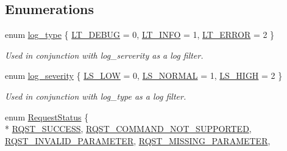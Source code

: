 \subsection*{Enumerations}
\begin{DoxyCompactItemize}
\item 
enum \hyperlink{namespacekisscpp_a18db16d1f4c281bec16e637c56b0cc88}{log\-\_\-type} \{ \hyperlink{namespacekisscpp_a18db16d1f4c281bec16e637c56b0cc88a5534dcd03ff720ecbe64b0c91ea3b228}{L\-T\-\_\-\-D\-E\-B\-U\-G} = 0, 
\hyperlink{namespacekisscpp_a18db16d1f4c281bec16e637c56b0cc88ad1c780d761d1eec16905dd8e306764aa}{L\-T\-\_\-\-I\-N\-F\-O} = 1, 
\hyperlink{namespacekisscpp_a18db16d1f4c281bec16e637c56b0cc88ad444adf89c01661a3f2cacd8baea3d90}{L\-T\-\_\-\-E\-R\-R\-O\-R} = 2
 \}
\begin{DoxyCompactList}\small\item\em Used in conjunction with log\-\_\-serverity as a log filter. \end{DoxyCompactList}\item 
enum \hyperlink{namespacekisscpp_a2479a56cdedf21357ca5c68adc699d00}{log\-\_\-severity} \{ \hyperlink{namespacekisscpp_a2479a56cdedf21357ca5c68adc699d00af0d1f4c43feb2c79cbd2c44cba171b9f}{L\-S\-\_\-\-L\-O\-W} = 0, 
\hyperlink{namespacekisscpp_a2479a56cdedf21357ca5c68adc699d00aac284c5fe534f527e04da9327a0e484e}{L\-S\-\_\-\-N\-O\-R\-M\-A\-L} = 1, 
\hyperlink{namespacekisscpp_a2479a56cdedf21357ca5c68adc699d00a98a2f9d2011b440e4a890b9c0dbb7bc2}{L\-S\-\_\-\-H\-I\-G\-H} = 2
 \}
\begin{DoxyCompactList}\small\item\em Used in conjunction with log\-\_\-type as a log filter. \end{DoxyCompactList}\item 
enum \hyperlink{namespacekisscpp_af5792fb0f68695c1a1e7a4c720d9262e}{Request\-Status} \{ \\*
\hyperlink{namespacekisscpp_af5792fb0f68695c1a1e7a4c720d9262ea48f403b25d056ead863e1bb74664b388}{R\-Q\-S\-T\-\_\-\-S\-U\-C\-C\-E\-S\-S}, 
\hyperlink{namespacekisscpp_af5792fb0f68695c1a1e7a4c720d9262ead080a858803c520f16f1d575431e19ec}{R\-Q\-S\-T\-\_\-\-C\-O\-M\-M\-A\-N\-D\-\_\-\-N\-O\-T\-\_\-\-S\-U\-P\-P\-O\-R\-T\-E\-D}, 
\hyperlink{namespacekisscpp_af5792fb0f68695c1a1e7a4c720d9262ea94213a4c1e365e07fad5537b158ccd8c}{R\-Q\-S\-T\-\_\-\-I\-N\-V\-A\-L\-I\-D\-\_\-\-P\-A\-R\-A\-M\-E\-T\-E\-R}, 
\hyperlink{namespacekisscpp_af5792fb0f68695c1a1e7a4c720d9262ea3ad7cafe8fc0329ea5edde0ebf5c807e}{R\-Q\-S\-T\-\_\-\-M\-I\-S\-S\-I\-N\-G\-\_\-\-P\-A\-R\-A\-M\-E\-T\-E\-R}, 

\end{DoxyCompactItemize}
